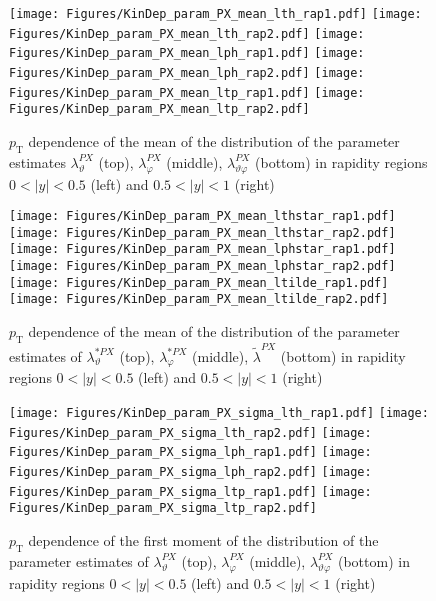 \documentclass[12pt]{article}
\newcommand{\pT}{p_\mathrm{T}}
\newcommand{\absy}{\left |  y \right |}
\newcommand{\lamthPX}{\lambda^{\scriptscriptstyle PX}_\vartheta}
\newcommand{\lamphPX}{\lambda^{\scriptscriptstyle PX}_\varphi}
\newcommand{\lamthphPX}{\lambda^{\scriptscriptstyle PX}_{\vartheta \varphi}}
\newcommand{\lamtildePX}{\tilde{\lambda}^{\scriptscriptstyle PX}}
\newcommand{\lamthstarPX}{\lambda^{* \scriptscriptstyle PX}_\vartheta}
\newcommand{\lamphstarPX}{\lambda^{* \scriptscriptstyle PX}_\varphi}
\begin{document}



\begin{figure}[htbp]
\centering
\texttt{[image: Figures/KinDep\_param\_PX\_mean\_lth\_rap1.pdf]}
\texttt{[image: Figures/KinDep\_param\_PX\_mean\_lth\_rap2.pdf]}
\texttt{[image: Figures/KinDep\_param\_PX\_mean\_lph\_rap1.pdf]}
\texttt{[image: Figures/KinDep\_param\_PX\_mean\_lph\_rap2.pdf]}
\texttt{[image: Figures/KinDep\_param\_PX\_mean\_ltp\_rap1.pdf]}
\texttt{[image: Figures/KinDep\_param\_PX\_mean\_ltp\_rap2.pdf]}
\caption{$\pT$ dependence of the mean of the distribution of the parameter estimates $\lamthPX$ (top), $\lamphPX$ (middle), $\lamthphPX$ (bottom) in rapidity regions $0<\absy<0.5$ (left) and $0.5<\absy<1$ (right)}
\end{figure}
\clearpage

\begin{figure}[htbp]
\centering
\texttt{[image: Figures/KinDep\_param\_PX\_mean\_lthstar\_rap1.pdf]}
\texttt{[image: Figures/KinDep\_param\_PX\_mean\_lthstar\_rap2.pdf]}
\texttt{[image: Figures/KinDep\_param\_PX\_mean\_lphstar\_rap1.pdf]}
\texttt{[image: Figures/KinDep\_param\_PX\_mean\_lphstar\_rap2.pdf]}
\texttt{[image: Figures/KinDep\_param\_PX\_mean\_ltilde\_rap1.pdf]}
\texttt{[image: Figures/KinDep\_param\_PX\_mean\_ltilde\_rap2.pdf]}
\caption{$\pT$ dependence of the mean of the distribution of the parameter estimates of $\lamthstarPX$ (top), $\lamphstarPX$ (middle), $\lamtildePX$ (bottom) in rapidity regions $0<\absy<0.5$ (left) and $0.5<\absy<1$ (right)}
\end{figure}
\clearpage


\begin{figure}[htbp]
\centering
\texttt{[image: Figures/KinDep\_param\_PX\_sigma\_lth\_rap1.pdf]}
\texttt{[image: Figures/KinDep\_param\_PX\_sigma\_lth\_rap2.pdf]}
\texttt{[image: Figures/KinDep\_param\_PX\_sigma\_lph\_rap1.pdf]}
\texttt{[image: Figures/KinDep\_param\_PX\_sigma\_lph\_rap2.pdf]}
\texttt{[image: Figures/KinDep\_param\_PX\_sigma\_ltp\_rap1.pdf]}
\texttt{[image: Figures/KinDep\_param\_PX\_sigma\_ltp\_rap2.pdf]}
\caption{$\pT$ dependence of the first moment of the distribution of the parameter estimates of $\lamthPX$ (top), $\lamphPX$ (middle), $\lamthphPX$ (bottom) in rapidity regions $0<\absy<0.5$ (left) and $0.5<\absy<1$ (right)}
\end{figure}
\clearpage
\end{document}

